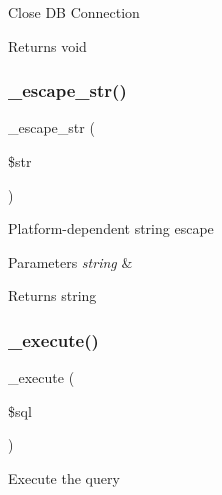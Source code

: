 Close DB Connection

\begin{DoxyReturn}{Returns}
void 
\end{DoxyReturn}
\mbox{\label{class_c_i___d_b__odbc__driver_af8ef0237bfcdb19215b63fff769e7a55}} 
\subsubsection{\texorpdfstring{\+\_\+escape\+\_\+str()}{\_escape\_str()}}
{\footnotesize\ttfamily \+\_\+escape\+\_\+str (\begin{DoxyParamCaption}\item[{}]{\$str }\end{DoxyParamCaption})\hspace{0.3cm}{\ttfamily [protected]}}

Platform-\/dependent string escape


\begin{DoxyParams}{Parameters}
{\em string} & \\
\hline
\end{DoxyParams}
\begin{DoxyReturn}{Returns}
string 
\end{DoxyReturn}
\mbox{\label{class_c_i___d_b__odbc__driver_a114ab675d89bf8324a41785fb475e86d}} 
\subsubsection{\texorpdfstring{\+\_\+execute()}{\_execute()}}
{\footnotesize\ttfamily \+\_\+execute (\begin{DoxyParamCaption}\item[{}]{\$sql }\end{DoxyParamCaption})\hspace{0.3cm}{\ttfamily [protected]}}

Execute the query


